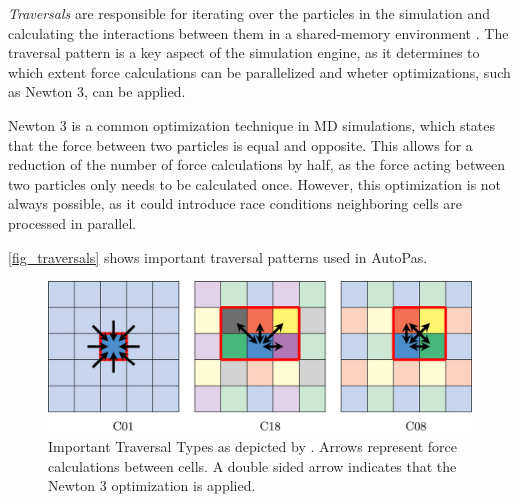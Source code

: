 \documentclass[conference]{IEEEtran}
\begin{document}
\textit{Traversals} are responsible for iterating over the particles in the simulation and calculating the interactions between them in a shared-memory environment \cite{SECKLER2021101296}. The traversal pattern is a key aspect of the simulation engine, as it determines to which extent force calculations can be parallelized and wheter optimizations, such as Newton 3, can be applied.

Newton 3 is a common optimization technique in MD simulations, which states that the force between two particles is equal and opposite. This allows for a reduction of the number of force calculations by half, as the force acting between two particles only needs to be calculated once. However, this optimization is not always possible, as it could introduce race conditions neighboring cells are processed in parallel.

\autoref{fig_traversals} shows important traversal patterns used in AutoPas.

\begin{figure}[h]
    \centering
    \includegraphics[width=\columnwidth]{figures/traversals.jpg}
    \caption{Important Traversal Types as depicted by \cite{NEWCOME2023115278}.
        Arrows represent force calculations between cells. A double sided arrow indicates that the Newton 3 optimization is applied.}
    \label{fig_traversals}
\end{figure}
\end{document}
